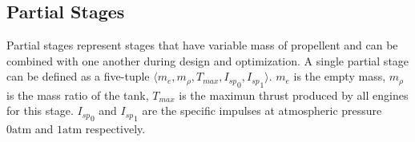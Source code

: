 \subsection{Partial Stages}
Partial stages represent stages that have variable mass of propellent and can be combined with one another during design
and optimization. A single partial stage can be defined as a five-tuple $\langle m_e, m_{\rho}, T_{max}, {I_{sp}}_0, {I_{sp}}_1 \rangle$.
$m_e$ is the empty mass, $m_{\rho}$ is the mass ratio of the tank, $T_{max}$ is the maximun thrust produced by all engines
for this stage. ${I_{sp}}_0$ and ${I_{sp}}_1$ are the specific impulses at atmospheric pressure $0\mathrm{atm}$ and
$1\mathrm{atm}$ respectively.
